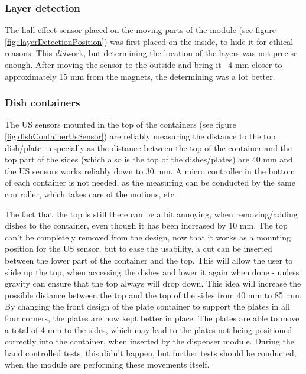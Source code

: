\documentclass[10pt,a4paper]{article}
\begin{document}
		
		\subsubsection{Layer detection}
		
		The hall effect sensor placed on the moving parts of the module (see figure \ref{fig::layerDetectionPosition}) was first placed on the inside, to hide it for ethical reasons. This \textit{did}work, but determining the location of the layers was not precise enough. After moving the sensor to the outside and bring it ~4 mm closer to approximately 15 mm from the magnets, the determining was a lot better.
		
				
		\subsubsection{Dish containers}	
		
										
		The US sensors mounted in the top of the containers (see figure \ref{fig:dishContainerUsSensor}) are reliably measuring the distance to the top dish/plate - especially as the distance between the top of the container and the top part of the sides (which also is the top of the dishes/plates) are 40 mm and the US sensors works reliably down to 30 mm. A micro controller in the bottom of each container is not needed, as the measuring can be conducted by the same controller, which takes care of the motions, etc.

		The fact that the top is still there can be a bit annoying, when removing/adding dishes to the container, even though it has been increased by 10 mm. The top can't be completely removed from the design, now that it works as a mounting position for the US sensor, but to ease the usability, a cut can be inserted between the lower part of the container and the top. This will allow the user to slide up the top, when accessing the dishes and lower it again when done - unless gravity can ensure that the top always will drop down. This idea will increase the possible distance between the top and the top of the sides from 40 mm to 85 mm.\\
		
		By changing the front design of the plate container to support the plates in all four corners, the plates are now kept better in place. The plates are able to move a total of 4 mm to the sides, which may lead to the plates not being positioned correctly into the container, when inserted by the dispenser module. During the hand controlled tests, this didn't happen, but further tests should be conducted, when the module are performing these movements itself.
		
\end{document}
